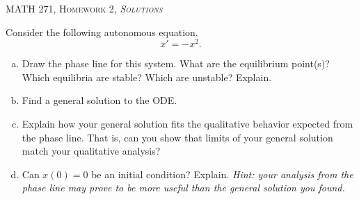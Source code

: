 \documentclass[12pt]{article} %
\begin{document}
\begin{center}
   \textsc{\large MATH 271, Homework 2, \emph{Solutions}}\\
\end{center}
\vspace{.5cm}

\begin{problem} 
Consider the following autonomous equation.
    \[
    x'=-x^2.
    \]
    \begin{enumerate}[(a)]
        \item Draw the phase line for this system. What are the equilibrium point(s)? Which equilibria are stable? Which are unstable? Explain.
        \item Find a general solution to the ODE.
        \item Explain how your general solution fits the qualitative behavior expected from the phase line. That is, can you show that limits of your general solution match your qualitative analysis?
        \item Can $x(0)=0$ be an initial condition? Explain. \emph{Hint: your analysis from the phase line may prove to be more useful than the general solution you found.}
    \end{enumerate}
\end{problem}
\end{document}
